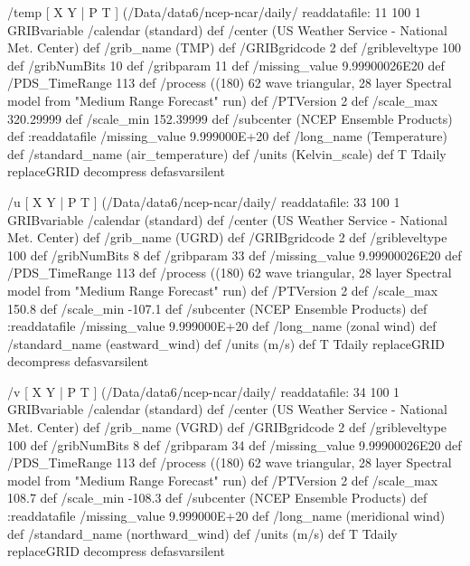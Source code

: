 \begin{ingrid}
  /temp { [ X Y | P T ] (/Data/data6/ncep-ncar/daily/%
  readdatafile:
  11 100 1 GRIBvariable
  /calendar (standard) def
  /center (US Weather Service - National Met. Center) def
  /grib_name (TMP) def
  /GRIBgridcode 2 def
  /gribleveltype 100 def
  /gribNumBits 10 def
  /gribparam 11 def
  /missing_value 9.99900026E20 def
  /PDS_TimeRange 113 def
  /process ((180) 62 wave triangular, 28 layer Spectral model from "Medium Range Forecast" run) def
  /PTVersion 2 def
  /scale_max 320.29999 def
  /scale_min 152.39999 def
  /subcenter (NCEP Ensemble Products) def
  :readdatafile
  /missing_value 9.999000E+20 def
  /long_name (Temperature) def
  /standard_name (air_temperature) def
  /units (Kelvin_scale) def
T Tdaily replaceGRID
  decompress
  } defasvarsilent

  /u { [ X Y | P T ] (/Data/data6/ncep-ncar/daily/%
  readdatafile:
  33 100 1 GRIBvariable
  /calendar (standard) def
  /center (US Weather Service - National Met. Center) def
  /grib_name (UGRD) def
  /GRIBgridcode 2 def
  /gribleveltype 100 def
  /gribNumBits 8 def
  /gribparam 33 def
  /missing_value 9.99900026E20 def
  /PDS_TimeRange 113 def
  /process ((180) 62 wave triangular, 28 layer Spectral model from "Medium Range Forecast" run) def
  /PTVersion 2 def
  /scale_max 150.8 def
  /scale_min -107.1 def
  /subcenter (NCEP Ensemble Products) def
  :readdatafile
  /missing_value 9.999000E+20 def
  /long_name (zonal wind) def
  /standard_name (eastward_wind) def
  /units (m/s) def
T Tdaily replaceGRID
  decompress
  } defasvarsilent

  /v { [ X Y | P T ] (/Data/data6/ncep-ncar/daily/%
  readdatafile:
  34 100 1 GRIBvariable
  /calendar (standard) def
  /center (US Weather Service - National Met. Center) def
  /grib_name (VGRD) def
  /GRIBgridcode 2 def
  /gribleveltype 100 def
  /gribNumBits 8 def
  /gribparam 34 def
  /missing_value 9.99900026E20 def
  /PDS_TimeRange 113 def
  /process ((180) 62 wave triangular, 28 layer Spectral model from "Medium Range Forecast" run) def
  /PTVersion 2 def
  /scale_max 108.7 def
  /scale_min -108.3 def
  /subcenter (NCEP Ensemble Products) def
  :readdatafile
  /missing_value 9.999000E+20 def
  /long_name (meridional wind) def
  /standard_name (northward_wind) def
  /units (m/s) def
T Tdaily replaceGRID
  decompress
  } defasvarsilent


\end{ingrid}
